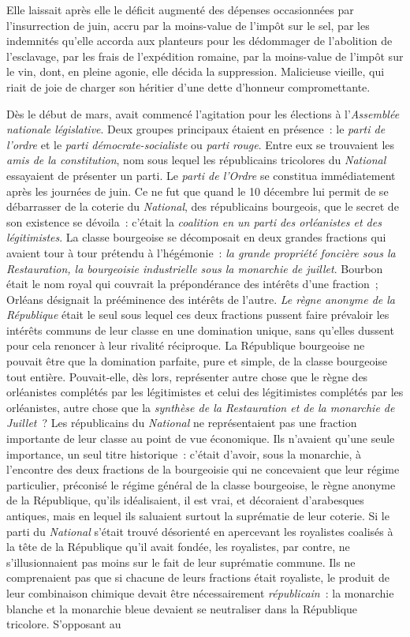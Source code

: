 \documentclass[twoside]{book} %
\begin{document}
Elle laissait après elle le déficit augmenté des dépenses occasionnées par l’insurrection de juin, accru par la moins-value de l’impôt sur le sel, par les indemnités qu’elle accorda aux planteurs pour les dédommager de l’abolition de l’esclavage, par les frais de l’expédition romaine, par la moins-value de l’impôt sur le vin, dont, en pleine agonie, elle décida la suppression. Malicieuse vieille, qui riait de joie de charger son héritier d’une dette d’honneur compromettante.\par
Dès le début de mars, avait commencé l’agitation pour les élections à l’\emph{Assemblée nationale législative}. Deux groupes principaux étaient en présence : le \emph{parti de l’ordre} et le \emph{parti démocrate-socialiste} ou \emph{parti rouge}. Entre eux se trouvaient les \emph{amis de la constitution}, nom sous lequel les républicains tricolores du \emph{National} essayaient de présenter un parti. Le \emph{parti de l’Ordre} se constitua immédiatement après les journées de juin. Ce ne fut que quand le 10 décembre lui permit de se débarrasser de la coterie du \emph{National}, des républicains bourgeois, que le secret de son existence se dévoila : c’était la \emph{coalition en un parti des orléanistes et des légitimistes}. La classe bourgeoise se décomposait en deux grandes fractions qui avaient tour à tour prétendu à l’hégémonie : \emph{la grande propriété foncière sous la Restauration, la bourgeoisie industrielle sous la monarchie de juillet}. Bourbon était le nom royal qui couvrait la prépondérance des intérêts d’une fraction ; Orléans désignait la prééminence des intérêts de l’autre. \emph{Le règne anonyme de la République} était le seul sous lequel ces deux fractions pussent faire prévaloir les intérêts communs de leur classe en une domination unique, sans qu’elles dussent pour cela renoncer à leur rivalité réciproque. La République bourgeoise ne pouvait être que la domination parfaite, pure et simple, de la classe bourgeoise tout entière. Pouvait-elle, dès lors, représenter autre chose que le règne des orléanistes complétés par les légitimistes et celui des légitimistes complétés par les orléanistes, autre chose que la \emph{synthèse de la Restauration et de la monarchie de Juillet} ? Les républicains du \emph{National} ne représentaient pas une fraction importante de leur classe au point de vue économique. Ils n’avaient qu’une seule importance, un seul titre historique : c’était d’avoir, sous la monarchie, à l’encontre des deux fractions de la bourgeoisie qui ne concevaient que leur régime particulier, préconisé le régime général de la classe bourgeoise, le règne anonyme de la République, qu’ils idéalisaient, il est vrai, et décoraient d’arabesques antiques, mais en lequel ils saluaient surtout la suprématie de leur coterie. Si le parti du \emph{National} s’était trouvé désorienté en apercevant les royalistes coalisés à la tête de la République qu’il avait fondée, les royalistes, par contre, ne s’illusionnaient pas moins sur le fait de leur suprématie commune. Ils ne comprenaient pas que si chacune de leurs fractions était royaliste, le produit de leur combinaison chimique devait être nécessairement \emph{républicain} : la monarchie blanche et la monarchie bleue devaient se neutraliser dans la République tricolore. S’opposant au 
\end{document}
